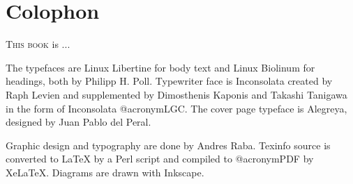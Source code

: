 
\printindex

\chapter*{Colophon}
\lettrine[lraise=-0.03,loversize=0.08]{T}{his book} is ...

The typefaces are Linux Libertine for body text and Linux Biolinum for headings, both by Philipp H. Poll. Typewriter face is Inconsolata created by Raph Levien and supplemented by Dimosthenis Kaponis and Takashi Tanigawa in the form of Inconsolata @acronym{LGC}. The cover page typeface is Alegreya, designed by Juan Pablo del Peral.

Graphic design and typography are done by Andres Raba. Texinfo source is converted to LaTeX by a Perl script and compiled to @acronym{PDF} by XeLaTeX. Diagrams are drawn with Inkscape.

